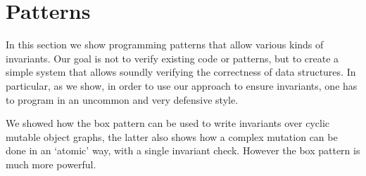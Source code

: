 \section{Patterns}
\label{s:patterns}

In this section we show programming patterns that allow various kinds of invariants.
Our goal is not to verify existing code or patterns,
but to create a simple system that allows soundly verifying the correctness of data structures.
In particular, as we show, in order to use our approach to ensure invariants, one has to program in an uncommon and very defensive style.

We showed how the box pattern can be used to write invariants over cyclic mutable object graphs, the latter also shows how a complex mutation can be done in an `atomic' way, with a single invariant check. However the box pattern is much more powerful.

